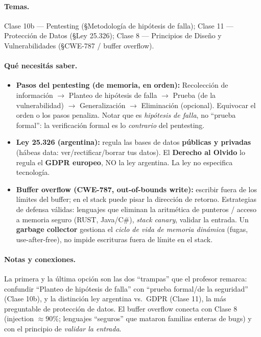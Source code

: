 \paragraph{Temas.}
Clase 10b --- Pentesting (\S Metodología de hipótesis de falla); Clase 11 --- Protección
de Datos (\S Ley 25.326); Clase 8 --- Principios de Diseño y Vulnerabilidades
(\S CWE-787 / buffer overflow).

\paragraph{Qué necesitás saber.}
\begin{itemize}
  \item \textbf{Pasos del pentesting (de memoria, en orden):} Recolección de información
  $\rightarrow$ Planteo de hipótesis de falla $\rightarrow$ Prueba (de la vulnerabilidad)
  $\rightarrow$ Generalización $\rightarrow$ Eliminación (opcional). Equivocar el orden o
  los pasos penaliza. Notar que es \emph{hipótesis de falla}, no ``prueba formal'': la
  verificación formal es lo \emph{contrario} del pentesting.
  \item \textbf{Ley 25.326 (argentina):} regula las bases de datos \textbf{públicas y
  privadas} (hábeas data: ver/rectificar/borrar tus datos). El \textbf{Derecho al Olvido}
  lo regula el \textbf{GDPR europeo}, NO la ley argentina. La ley no especifica tecnología.
  \item \textbf{Buffer overflow (CWE-787, out-of-bounds write):} escribir fuera de los
  límites del buffer; en el stack puede pisar la dirección de retorno. Estrategias de
  defensa válidas: lenguajes que eliminan la aritmética de punteros / acceso a memoria
  seguro (RUST, Java/C\#), \emph{stack canary}, validar la entrada. Un \textbf{garbage
  collector} gestiona el \emph{ciclo de vida de memoria dinámica} (fugas, use-after-free),
  no impide escrituras fuera de límite en el stack.
\end{itemize}

\paragraph{Notas y conexiones.}
La primera y la última opción son las dos ``trampas'' que el profesor remarca: confundir
``Planteo de hipótesis de falla'' con ``prueba formal/de la seguridad'' (Clase 10b), y la
distinción ley argentina vs.\ GDPR (Clase 11), la más preguntable de protección de datos.
El buffer overflow conecta con Clase 8 (injection $\approx 90\%$; lenguajes ``seguros''
que mataron familias enteras de bugs) y con el principio de \emph{validar la entrada}.

